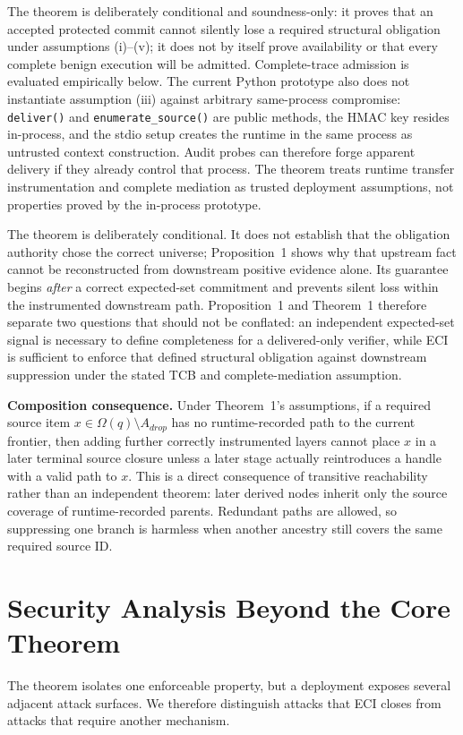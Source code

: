 \documentclass[journal,compsoc]{IEEEtran}
\begin{document}
The theorem is deliberately conditional and soundness-only: it proves that an accepted protected commit cannot silently lose a required structural obligation under assumptions (i)--(v); it does not by itself prove availability or that every complete benign execution will be admitted. Complete-trace admission is evaluated empirically below. The current Python prototype also does not instantiate assumption (iii) against arbitrary same-process compromise: \texttt{deliver()} and \texttt{enumerate\_source()} are public methods, the HMAC key resides in-process, and the stdio setup creates the runtime in the same process as untrusted context construction. Audit probes can therefore forge apparent delivery if they already control that process. The theorem treats runtime transfer instrumentation and complete mediation as trusted deployment assumptions, not properties proved by the in-process prototype.

The theorem is deliberately conditional. It does not establish that the obligation authority chose the correct universe; Proposition~1 shows why that upstream fact cannot be reconstructed from downstream positive evidence alone. Its guarantee begins \emph{after} a correct expected-set commitment and prevents silent loss within the instrumented downstream path. Proposition~1 and Theorem~1 therefore separate two questions that should not be conflated: an independent expected-set signal is necessary to define completeness for a delivered-only verifier, while ECI is sufficient to enforce that defined structural obligation against downstream suppression under the stated TCB and complete-mediation assumption.

\noindent\textbf{Composition consequence.}
Under Theorem~1's assumptions, if a required source item $x\in\Omega(q)\setminus A_{drop}$ has no runtime-recorded path to the current frontier, then adding further correctly instrumented layers cannot place $x$ in a later terminal source closure unless a later stage actually reintroduces a handle with a valid path to $x$. This is a direct consequence of transitive reachability rather than an independent theorem: later derived nodes inherit only the source coverage of runtime-recorded parents. Redundant paths are allowed, so suppressing one branch is harmless when another ancestry still covers the same required source ID.

\section{Security Analysis Beyond the Core Theorem}
The theorem isolates one enforceable property, but a deployment exposes several adjacent attack surfaces. We therefore distinguish attacks that ECI closes from attacks that require another mechanism.
\end{document}
